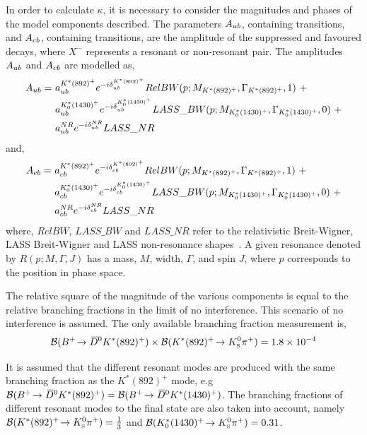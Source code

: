 In order to calculate $\kappa$, it is necessary to consider the magnitudes and phases of the model components described. The parameters $A_{{u}{b}}$, containing \decay{\bquark}{\uquark} transitions, and $A_{{c}{b}}$, containing \decay{\bquark}{\cquark} transitions, are the amplitude of the suppressed and favoured  decays, where $X^-$ represents a resonant or non-resonant \KS\pim pair. The amplitudes $A_{{u}{b}}$ and $A_{{c}{b}}$ are modelled as,
\begin{align*}
A_{\uquark\bquark} =\ & a_{\uquark\bquark}^{K^*(892)^+}e^{-i\delta_{\uquark\bquark}^{K^*(892)^+}}RelBW(p;M_{K^*(892)^+},\Gamma_{K^*(892)^+},1)\ + \\
& a_{\uquark\bquark}^{K^*_0(1430)^+}e^{-i\delta_{\uquark\bquark}^{K^*_0(1430)^+}}LASS\_BW(p;M_{K^*_0(1430)^+},\Gamma_{K^*_0(1430)^+},0)\ + \\
& a_{\uquark\bquark}^{NR}e^{-i\delta_{\uquark\bquark}^{NR}}LASS\_NR
\end{align*}
and,
\begin{align*}
A_{\cquark\bquark} =\ & a_{\cquark\bquark}^{K^*(892)^+}e^{-i\delta_{\cquark\bquark}^{K^*(892)^+}}RelBW(p;M_{K^*(892)^+},\Gamma_{K^*(892)^+},1)\ + \\
& a_{\cquark\bquark}^{K^*_0(1430)^+}e^{-i\delta_{\cquark\bquark}^{K^*_0(1430)^+}}LASS\_BW(p;M_{K^*_0(1430)^+},\Gamma_{K^*_0(1430)^+},0)\ + \\
& a_{\cquark\bquark}^{NR}e^{-i\delta_{\cquark\bquark}^{NR}}LASS\_NR
\end{align*}
where, $RelBW$, $LASS\_BW$ and $LASS\_NR$ refer to the relativistic Breit-Wigner, LASS Breit-Wigner and LASS non-resonance shapes~\cite{LASS}. A given resonance denoted by $R(p;M,\Gamma,J)$ has a mass, $M$, width, $\Gamma$, and spin $J$, where $p$ corresponds to the position in \decay{\Bm}{\D\KS\pim} phase space.%

The relative square of the magnitude of the various components is equal to the relative branching fractions in the limit of no interference. This scenario of no interference is assumed. The only available branching fraction measurement is,
\begin{equation*}
{\ensuremath{\mathcal{B}}}({{{B}^+}}\!\rightarrow {\ensuremath{{\kern 0.2em\overline{\kern -0.2em D}{}}{}^0}} K^*(892)^+) \times {\ensuremath{\mathcal{B}}}(K^*(892)^+\!\rightarrow {\ensuremath{{K}^0_{\mathrm{ \scriptscriptstyle S}}}}{\ensuremath{{\pi}^+}}) = 1.8 \times 10^{-4}
\end{equation*}

It is assumed that the different resonant \Kstarp modes are produced with the same branching fraction as the $K^*(892)^+$ mode, e.g ${\mathcal{B}}({{{B}^+}}\!\rightarrow {\ensuremath{{\kern 0.2em\overline{\kern -0.2em D}{}}{}^0}} K^*(892)^+) = {\mathcal{B}}({{{B}^+}}\!\rightarrow {\ensuremath{{\kern 0.2em\overline{\kern -0.2em D}{}}{}^0}} K^*(1430)^+)$. The branching fractions of different resonant \Kstarp modes to the \KS\pip final state are also taken into account, namely ${\mathcal{B}}(K^*(892)^+\!\rightarrow {\ensuremath{{K}^0_{\mathrm{ \scriptscriptstyle S}}}}{\ensuremath{{\pi}^+}}) = \frac{1}{3}$ and ${\mathcal{B}}(K^*_0(1430)^+\!\rightarrow {\ensuremath{{K}^0_{\mathrm{ \scriptscriptstyle S}}}}{\ensuremath{{\pi}^+}}) = 0.31$.

